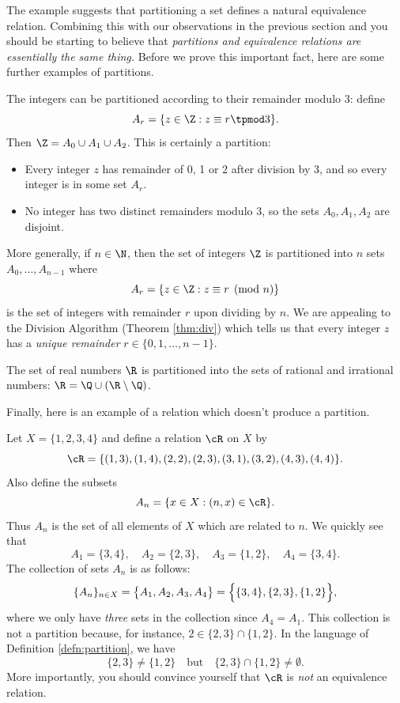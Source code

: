 \noindent The example suggests that partitioning a set defines a natural equivalence relation. Combining this with our observations in the previous section and you should be starting to believe that \emph{partitions and equivalence relations are essentially the same thing.} Before we prove this important fact, here are some further examples of partitions.

\begin{examples}
\item The integers can be partitioned according to their remainder modulo 3: define
\[A_r=\{z\in\Z:z\equiv r\tpmod 3\}.\]
Then $\Z=A_0\cup A_1\cup A_2$. This is certainly a partition:
\begin{itemize}
  \item Every integer $z$ has remainder of 0, 1 or 2 after division by 3, and so every integer is in some set $A_r$.
  \item No integer has two distinct remainders modulo 3, so the sets $A_0,A_1,A_2$ are disjoint.
\end{itemize}
\item\label{ex:cong} More generally, if $n\in\N$, then the set of integers $\Z$ is partitioned into $n$ sets $A_0,\ldots,A_{n-1}$ where
\[A_r=\{z\in\Z:z\equiv r\pmod n\}\]
is the set of integers with remainder $r$ upon dividing by $n$. We are appealing to the Division Algorithm (Theorem \ref{thm:div}) which tells us that every integer $z$ has a \emph{unique remainder} $r\in\{0,1,\ldots,n-1\}$.
\item The set of real numbers $\R$ is partitioned into the sets of rational and irrational numbers: $\R=\Q\cup(\R\setminus\Q)$.
\end{examples}

\noindent Finally, here is an example of a relation which doesn't produce a partition.

\begin{example}\label{ex:partnot}
Let $X=\{1,2,3,4\}$ and define a relation $\cR$ on $X$ by
\[\cR=\{(1,3),(1,4),(2,2),(2,3),(3,1),(3,2),(4,3),(4,4)\}.\]
Also define the subsets
\[A_n=\{x\in X:(n,x)\in\cR\}.\]
Thus $A_n$ is the set of all elements of $X$ which are related to $n$. We quickly see that
\[A_1=\{3,4\},\quad A_2=\{2,3\},\quad A_3=\{1,2\},\quad A_4=\{3,4\}.\]
The collection of sets $A_n$ is as follows:
\[\{A_n\}_{n\in X}=\bigl\{A_1,A_2,A_3,A_4\bigr\}=\Bigl\{\{3,4\},\{2,3\},\{1,2\}\Bigr\},\]
where we only have \emph{three} sets in the collection since $A_4=A_1$. This collection is not a partition because, for instance, $2\in \{2,3\}\cap\{1,2\}$. In the language of Definition \ref{defn:partition}, we have
\[\{2,3\}\neq\{1,2\}\quad\text{but}\quad \{2,3\}\cap\{1,2\}\neq\emptyset.\]
More importantly, you should convince yourself that $\cR$ is \emph{not} an equivalence relation.
\end{example}

